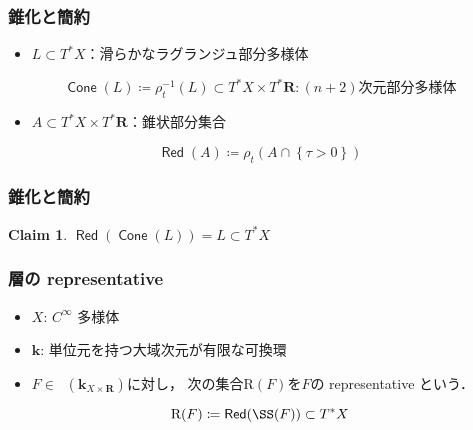 \documentclass[dvipdfmx,12pt,aspectratio=169,leqno]{beamer}%
\newcommand{\rr}{\mathbf{R}}
\newcommand{\kk}{\mathbf{k}}
\numberwithin{equation}{subsection}
\newcommand{\Dompb}{\mathop{\mathsf{D}^\mathrm{b}}\nolimits}
\newcommand{\Red}{\mathop{\mathsf{Red}}\nolimits}
\newcommand{\Cone}{\mathop{\mathsf{Cone}}\nolimits}
\theoremstyle{mystyle}
\newtheorem{CLM}[AXM]{Claim}
\begin{document}
\begin{frame}
    \frametitle{錐化と簡約}
    \begin{definition}
        \begin{itemize}
            \item \(L\subset T^{\ast}X\)：滑らかなラグランジュ部分多様体
        \end{itemize}
        \[
            \Cone(L)\coloneqq
            \rho_{t}^{-1}(L)\subset 
            T^{\ast}X\times T^{\ast}\rr
            \colon\text{\((n+2)\)次元部分多様体}
        \]
    \end{definition}
    
    \begin{definition}
        \begin{itemize}
            \item \(A\subset T^{\ast}X\times T^{\ast}\rr\)：錐状部分集合
        \end{itemize}
        \[\Red(A)\coloneqq\rho_{t}(A\cap\left\{\tau>0\right\})\]
    \end{definition}

\end{frame}
\begin{frame}
    \frametitle{錐化と簡約}

    \begin{CLM}
        \(\Red(\Cone(L))=L\subset T^{\ast}X\)
    \end{CLM}
\end{frame}


\begin{frame}
    \frametitle{層の representative}

    \begin{itemize}
        \item \(X\): \(C^\infty\) 多様体
        \item \(\mathbf{k}\): 単位元を持つ大域次元が有限な可換環
    \end{itemize}
    
    \begin{definition}[層の representative]
        \begin{itemize}
            \item \(F\in \Dompb(\kk_{X\times \rr})\)に対し，
            次の集合\(\mathrm{R}(F)\)を\(F\)の representative という．
        \end{itemize}
        \[\mathrm{R}(F)\coloneqq\Red(\SS(F))\subset T^{\ast}X\]
    \end{definition}

\end{frame}
\end{document}
